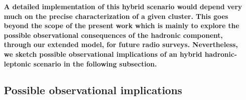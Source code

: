 \documentclass[useAMS,usenatbib]{mn2e}
\begin{document}
{\bf A detailed implementation of this hybrid scenario would depend very much
on the precise characterization of a given cluster. This goes beyond the scope of the 
present work which is mainly to explore the possible observational consequences of the 
hadronic component, through our extended model, for future radio surveys. Nevertheless, 
we sketch possible observational implications of an hybrid hadronic-leptonic scenario in the 
following subsection.}

\subsection{Possible observational implications}
\end{document}
